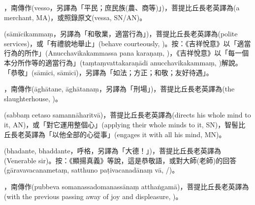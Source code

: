 \startitemgroup[noteitems]
\item{}，南傳作(vesso，另譯為「平民；庶民族(農、商等)」)，菩提比丘長老英譯為(a merchant, MA)，或照錄原文(vessa, SN/AN)。
\stopitemgroup

\startitemgroup[noteitems]
\item{}(sāmīcikammaṃ，另譯為「和敬業，適當行為」)，菩提比丘長老英譯為(polite services)，或「有禮貌地舉止」(behave courteously, )。按：《吉祥悅意》以「適當行為的所作」(Anucchavikakammassa pana karaṇaṃ, )，《吉祥悅意》以「每一個本分所作等的適當行為」(taṃtaṃvattakaraṇādi anucchavikakammaṃ, )解說。「恭敬」(sāmīci, sāmīcī)，另譯為「如法；方正；和敬；友好待遇」。
\stopitemgroup

\startitemgroup[noteitems]
\item{}，南傳作(āghātane, āghātanaṃ，另譯為「刑場」)，菩提比丘長老英譯為(the slaughterhouse, )。
\stopitemgroup

\startitemgroup[noteitems]
\item{}(sabbaṃ cetaso samannāharitvā)，菩提比丘長老英譯為(directs his whole mind to it, AN)，或「對它運用整個心」(applying their whole minds to it, SN)，智髻比丘長老英譯為「以他全部的心從事」(engages it with all his mind, MN)。
\stopitemgroup

\startitemgroup[noteitems]
\item{}(bhadante, bhaddante，呼格，另譯為「大德！」)，菩提比丘長老英譯為(Venerable sir)。按：《顯揚真義》等說，這是恭敬語，或對大師(老師)的回答(gāravavacanametaṃ, satthuno paṭivacanadānaṃ vā, /)。
\stopitemgroup

\startitemgroup[noteitems]
\item{}，南傳作(pubbeva somanassadomanassānaṃ atthaṅgamā)，菩提比丘長老英譯為(with the previous passing away of joy and displeasure, )。
\stopitemgroup

